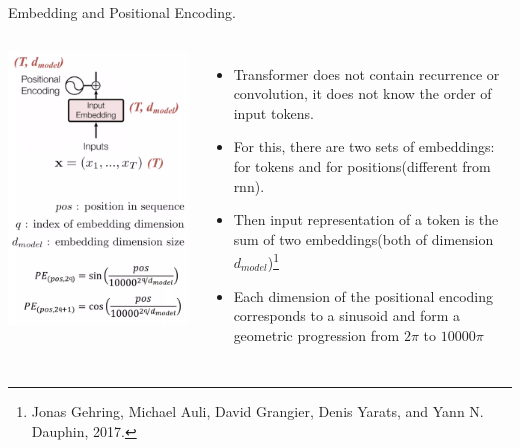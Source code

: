 \documentclass{beamer}
\begin{document}
\begin{frame}{Embedding and Positional Encoding.}
\begin{columns}
  \includegraphics[width=1.25\linewidth]{f7.png} %
  \begin{itemize}
    \item Transformer does not contain recurrence or convolution, it does not know the order of input tokens.
    \item For this, there are two sets of embeddings: for tokens and for positions(different from rnn).
    \item Then input representation of a token is the sum of two embeddings(both of dimension $d_{model}$)\footnote{Jonas Gehring, Michael Auli, David Grangier, Denis Yarats, and Yann N. Dauphin, 2017.
}
    \item  Each dimension of the positional encoding corresponds to a sinusoid and form a geometric progression from $2\pi$ to $10000\pi$
\end{itemize}
\end{columns}
\end{frame}
\end{document}

